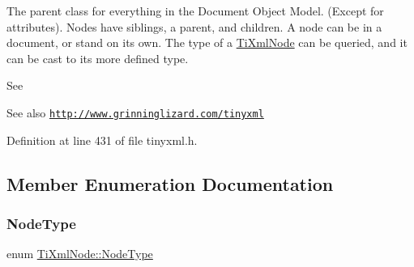 The parent class for everything in the Document Object Model. (Except for attributes). Nodes have siblings, a parent, and children. A node can be in a document, or stand on its own. The type of a \hyperlink{class_ti_xml_node}{Ti\+Xml\+Node} can be queried, and it can be cast to its more defined type.

See \begin{DoxySeeAlso}{See also}
\href{http://www.grinninglizard.com/tinyxml}{\tt http\+://www.\+grinninglizard.\+com/tinyxml} 
\end{DoxySeeAlso}


Definition at line 431 of file tinyxml.\+h.



\subsection{Member Enumeration Documentation}
\hypertarget{class_ti_xml_node_a836eded4920ab9e9ef28496f48cd95a2}{}\label{class_ti_xml_node_a836eded4920ab9e9ef28496f48cd95a2} 
\subsubsection{\texorpdfstring{Node\+Type}{NodeType}}
{\footnotesize\ttfamily enum \hyperlink{class_ti_xml_node_a836eded4920ab9e9ef28496f48cd95a2}{Ti\+Xml\+Node\+::\+Node\+Type}}

